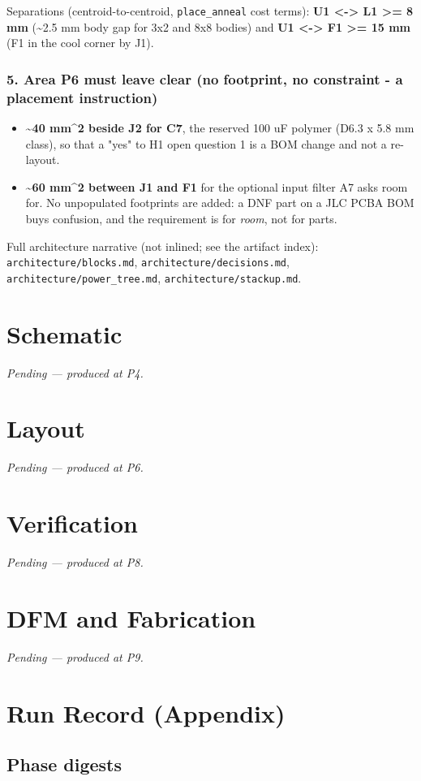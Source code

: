 \documentclass[11pt,a4paper]{article}
\begin{document}
Separations (centroid-to-centroid, \texttt{place\_anneal} cost terms): \textbf{U1 \textless{}-\textgreater{} L1 \textgreater{}= 8 mm} (\textasciitilde{}2.5 mm body gap for 3x2 and 8x8 bodies) and \textbf{U1 \textless{}-\textgreater{} F1 \textgreater{}= 15 mm} (F1 in the cool corner by J1).

\subsubsection*{5. Area P6 must leave clear (no footprint, no constraint - a placement instruction)}
\begin{itemize}
\item \textbf{\textasciitilde{}40 mm\textasciicircum{}2 beside J2 for C7}, the reserved 100 uF polymer (D6.3 x 5.8 mm class),
so that a "yes" to H1 open question 1 is a BOM change and not a re-layout.
\item \textbf{\textasciitilde{}60 mm\textasciicircum{}2 between J1 and F1} for the optional input filter A7 asks room for. No
unpopulated footprints are added: a DNF part on a JLC PCBA BOM buys confusion, and
the requirement is for \emph{room}, not for parts.
\end{itemize}
Full architecture narrative (not inlined; see the artifact index): \texttt{architecture/blocks.md}, \texttt{architecture/decisions.md}, \texttt{architecture/power\_tree.md}, \texttt{architecture/stackup.md}.
\section{Schematic}
\emph{Pending --- produced at P4.}
\section{Layout}
\emph{Pending --- produced at P6.}
\section{Verification}
\emph{Pending --- produced at P8.}
\section{DFM and Fabrication}
\emph{Pending --- produced at P9.}
\section{Run Record (Appendix)}
\subsection*{Phase digests}
\end{document}
